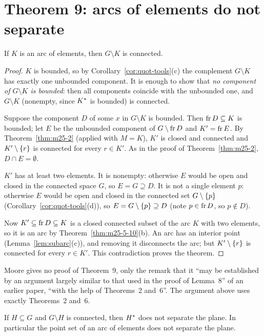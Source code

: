 \section{Theorem 9: arcs of elements do not separate}

\begin{theorem}\label{thm:m25-9}
If $K$ is an arc of elements, then $G\setminus K$ is connected.
\end{theorem}

\begin{proof}
$K$ is bounded, so by Corollary~\ref{cor:quot-tools}(c) the complement $G\setminus K$ has exactly one
unbounded component. It is enough to show that \emph{no component of $G\setminus K$ is bounded}: then
all components coincide with the unbounded one, and $G\setminus K$ (nonempty, since $K^{\ast}$ is
bounded) is connected.

Suppose the component $D$ of some $x$ in $G\setminus K$ is bounded. Then $\operatorname{fr} D\subseteq K$ is bounded;
let $E$ be the unbounded component of $G\setminus\operatorname{fr} D$ and $K'=\operatorname{fr} E$. By Theorem~\ref{thm:m25-2}
(applied with $M=K$), $K'$ is closed and connected and $K'\setminus\left\{ r \right\}$ is connected for every $r\in
K'$. As in the proof of Theorem~\ref{thm:m25-2}, $D\cap E=\emptyset$.

$K'$ has at least two elements. It is nonempty: otherwise $E$ would be open and closed in the
connected space $G$, so $E=G\supseteq D$. It is not a single element $p$: otherwise $E$ would be open
and closed in the connected set $G\setminus\left\{ p \right\}$ (Corollary~\ref{cor:quot-tools}(d)), so
$E=G\setminus\left\{ p \right\}\supseteq D$ (note $p\in\operatorname{fr} D$, so $p\notin D$).

Now $K'\subseteq\operatorname{fr} D\subseteq K$ is a closed connected subset of the arc $K$ with two elements, so it is
an arc by Theorem~\ref{thm:m25-5-10}(b). An arc has an interior point (Lemma~\ref{lem:subarc}(c)), and
removing it disconnects the arc; but $K'\setminus\left\{ r \right\}$ is connected for every $r\in K'$. This
contradiction proves the theorem.
\end{proof}


Moore gives no proof of Theorem~9, only the remark that it ``may be established by an argument
largely similar to that used in the proof of Lemma~8'' of an earlier paper, ``with the help of
Theorems~2 and~6''. The argument above uses exactly Theorems~2 and~6.

\begin{corollary}\label{cor:pts-nonsep}
If $H\subseteq G$ and $G\setminus H$ is connected, then $H^{\ast}$ does not separate the plane. In
particular the point set of an arc of elements does not separate the plane.
\end{corollary}

